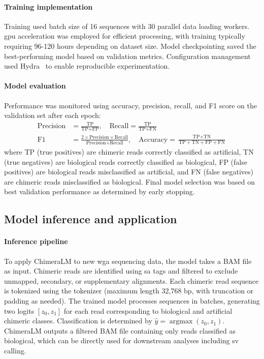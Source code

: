 \documentclass[pdflatex,sn-nature,lineno]{sn-jnl}%
\DeclareMathOperator*{\argmax}{argmax}
\theoremstyle{thmstyleone}%
\theoremstyle{thmstyletwo}%
\theoremstyle{thmstylethree}%
\begin{document}
\paragraph{Training implementation}
Training used batch size of 16 sequences with 30 parallel data loading workers.
\gls{gpu} acceleration was employed for efficient processing, with training typically requiring 96-120 hours depending on dataset size.
Model checkpointing saved the best-performing model based on validation metrics.
Configuration management used Hydra~\cite{Yadan2019Hydra} to enable reproducible experimentation.

\paragraph{Model evaluation}
Performance was monitored using accuracy, precision, recall, and F1 score on the validation set after each epoch:
\begin{align*}
\text{Precision} &= \frac{\text{TP}}{\text{TP}+\text{FP}}, \quad
\text{Recall} = \frac{\text{TP}}{\text{TP}+\text{FN}} \\
\text{F1} &= \frac{2 \times \text{Precision} \times \text{Recall}}{\text{Precision} + \text{Recall}}, \quad
\text{Accuracy} = \frac{\text{TP} + \text{TN}}{\text{TP} + \text{TN} + \text{FP} + \text{FN}}
\end{align*}
where TP (true positives) are chimeric reads correctly classified as artificial, TN (true negatives) are biological reads correctly classified as biological, FP (false positives) are biological reads misclassified as artificial, and FN (false negatives) are chimeric reads misclassified as biological. Final model selection was based on best validation performance as determined by early stopping.

\subsection*{Model inference and application}

\paragraph{Inference pipeline}
To apply ChimeraLM to new \gls{wga} sequencing data, the model takes a BAM file as input.
Chimeric reads are identified using \gls{sa} tags and filtered to exclude unmapped, secondary, or supplementary alignments.
Each chimeric read sequence is tokenized using the tokenizer (maximum length 32,768 bp, with truncation or padding as needed).
The trained model processes sequences in batches, generating two logits $[z_0, z_1]$ for each read corresponding to biological and artificial chimeric classes.
Classification is determined by $\hat{y} = \argmax(z_0, z_1)$.
ChimeraLM outputs a filtered BAM file containing only reads classified as biological, which can be directly used for downstream analyses including \gls{sv} calling.
\end{document}
